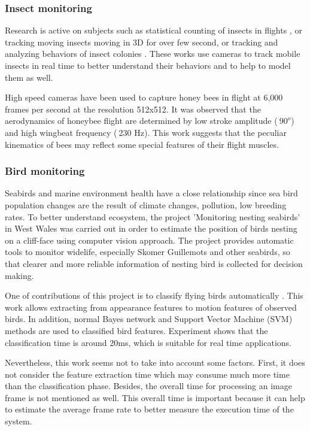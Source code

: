 \documentclass[10pt,a4paper]{article}
\begin{document}
\subsubsection {Insect monitoring}
Research is active on subjects such as statistical counting of insects in flights \cite{Hart:2012:CIF:2425836.2425891}, or tracking moving insects \cite{Bee1247421} moving in 3D for over few second, or tracking and analyzing behaviors of insect colonies \cite{Balch:2001:ATA:375735.376434}. These works use cameras to track mobile insects in real time to better understand their behaviors and to help to model them as well.

High speed cameras \cite{BeeFrequency} have been used to capture honey bees in flight at 6,000 frames per second at the resolution 512x512. It was observed that the aerodynamics of honeybee flight are determined by low stroke amplitude ($~90^{o}$) and high wingbeat frequency ($~$230 Hz). This work  suggests that the peculiar kinematics of bees may reflect some special features of their flight muscles.

\subsubsection {Bird monitoring}

Seabirds and marine environment health have a close relationship since sea bird population changes are the result of climate changes, pollution, low breeding rates. To better understand ecosystem, the project 'Monitoring nesting seabirds' \cite{Seabird1} in West Wales was carried out in order to estimate the position of birds nesting on a cliff-face using computer vision approach. The project provides automatic tools to monitor widelife, especially Skomer Guillemots and other seabirds, so that clearer and more reliable information of nesting bird is collected for decision making. 

One of contributions of this project is  to classify flying birds automatically \cite{Atanbori2015}. This work allows extracting from appearance features to motion features of observed birds. In addition, normal Bayes network and Support Vector Machine (SVM) methods are used to classified bird features. Experiment shows that the classification time is around 20ms, which is suitable for real time applications.

Nevertheless, this work seems not to take into account some factors. First, it does not consider the feature extraction time which may consume much more time than the classification phase. Besides, the overall time for processing an image frame is not mentioned as well. This overall time is important because it can help to estimate the average frame rate to better measure the execution time of the system.
\end{document}
